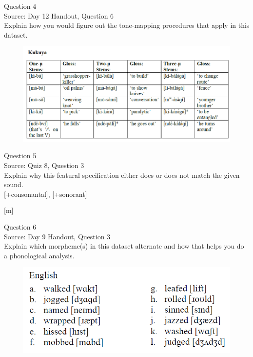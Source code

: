 \documentclass[12pt]{article}
\begin{document}
\newpage

{\large Question 4}\\

Source: Day 12 Handout, Question 6\\

Explain how you would figure out the tone-mapping procedures that apply in this dataset.\\

\begin{figure}[H]
\includegraphics{../images/kukuya.png}
\end{figure}

\newpage

{\large Question 5}\\

Source: Quiz 8, Question 3\\

Explain why this featural specification either does or does not match the given sound.\\

{[+consonantal]}, {[+sonorant]}

{[m]}


\newpage

{\large Question 6}\\

Source: Day 9 Handout, Question 3\\

Explain which morpheme(s) in this dataset alternate and how that helps you do a phonological analysis.\\

\begin{figure}[H]
\includegraphics{../images/english_past.png}
\end{figure}
\end{document}
